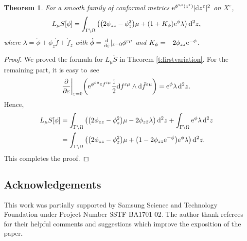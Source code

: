 \documentclass[pdftex]{sigma}%
\numberwithin{equation}{section}
\newtheorem{Theorem}{Theorem}[section]
\newcommand{\vep}{\varepsilon}
\begin{document}
\begin{Theorem}
For a smooth family of conformal metrics ${\rm e}^{\phi^{\vep\mu}(z^\vep)}|{\rm d}z^\vep|^2$ on $X^\vep$,
\begin{gather*}
L_{\mu} {S}[\phi]=\int_{\Gamma\backslash \Omega} \big(\big(2\phi_{zz}-\phi^2_z\big)\mu +(1+K_\phi) {\rm e}^{\phi} \lambda \big)\, {\rm d}^2z,
\end{gather*}
where $\lambda=\dot{\phi}+\phi_z \dot{f} +\dot{f}_z$ with $\dot{\phi}=\frac{\rm d}{{\rm d}\vep}|_{\vep=0} \phi^{\vep\mu}$ and $K_\phi=-2\phi_{z\bar{z}} {\rm e}^{-\phi}$.
\end{Theorem}

\begin{proof}
We proved the formula for $L_{\mu} \check{S}$ in Theorem \ref{t:firstvariation}. For the remaining part,
it is easy to~see
\begin{gather*}
\frac{\partial}{\partial\vep}\bigg|_{\vep=0} \bigg( {\rm e}^{\phi^{\vep\mu}\circ f^{\vep\mu}} \frac{\rm i}{2} {\rm d}f^{\vep\mu}\wedge {\rm d}\bar{f}^{\vep\mu} \bigg) = {\rm e}^\phi \lambda\, {\rm d}^2z.
\end{gather*}
Hence,
\begin{align*}
L_\mu S[\phi] &=\int_{\Gamma\backslash \Omega} \big( \big(2\phi_{zz}-\phi^2_z\big)\mu -2\phi_{z\bar{z}} \lambda \big)\, {\rm d}^2z + \int_{\Gamma\backslash \Omega} {\rm e}^\phi \lambda\, {\rm d}^2z
\\
&= \int_{\Gamma\backslash \Omega} \big(\big(2\phi_{zz}-\phi^2_z\big)\mu +\big(1 -2\phi_{z\bar{z}} {\rm e}^{-\phi} \big) {\rm e}^{\phi}\lambda \big)\, {\rm d}^2z.
\end{align*}
This completes the proof.
\end{proof}

\subsection*{Acknowledgements}
This work was partially supported by Samsung Science and Technology Foundation under Project Number SSTF-BA1701-02.
The author thank referees for their helpful comments and suggestions which improve the exposition of the paper.
\end{document}
